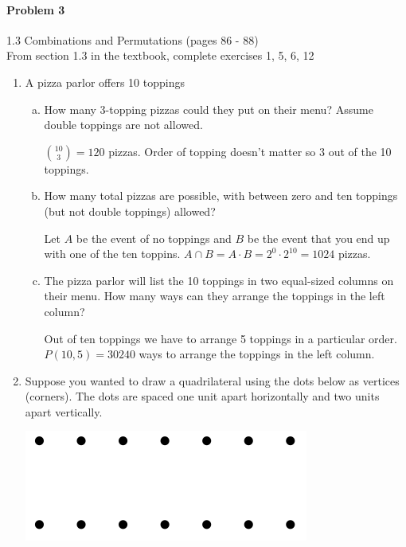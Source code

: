 \documentclass[11pt, a4paper]{article}
\newcommand\setItemNumber[1]{\setcounter{enumi}{\numexpr#1-1\relax}}
\begin{document}
	\paragraph{Problem 3} 1.3 Combinations and Permutations (pages 86 - 88)\\
	From section 1.3 in the textbook, complete exercises 1, 5, 6, 12
    \begin{enumerate}

        \item A pizza parlor offers 10 toppings
            \begin{enumerate}[(a)]
                \item How many 3-topping pizzas could they put on their menu? Assume double toppings are not allowed.

                    ${10\choose 3} = 120$ pizzas. Order of topping doesn't matter so 3 out of the 10 toppings. 

                \item How many total pizzas are possible, with between zero and ten toppings (but not double toppings) allowed?

                    Let $A$ be the event of no toppings and $B$ be the event that you end up with one of the ten toppins. $A\cap B = A\cdot B = 2^0\cdot 2^{10} = 1024$ pizzas. 

                \item The pizza parlor will list the 10 toppings in two equal-sized columns on their menu. How many ways can they arrange the toppings in the left column?

                Out of ten toppings we have to arrange 5 toppings in a particular order. $P(10,5) = 30240$ ways to arrange the toppings in the left column. 

            \end{enumerate}

        \setItemNumber{5}
        \item Suppose you wanted to draw a quadrilateral using the dots below as vertices (corners). The dots are spaced one unit apart horizontally and two units apart vertically.

            \begin{center}
            \includegraphics[width=.5\textwidth]{hw4_graphic1}
            \end{center}


\end{enumerate}
\end{document}
